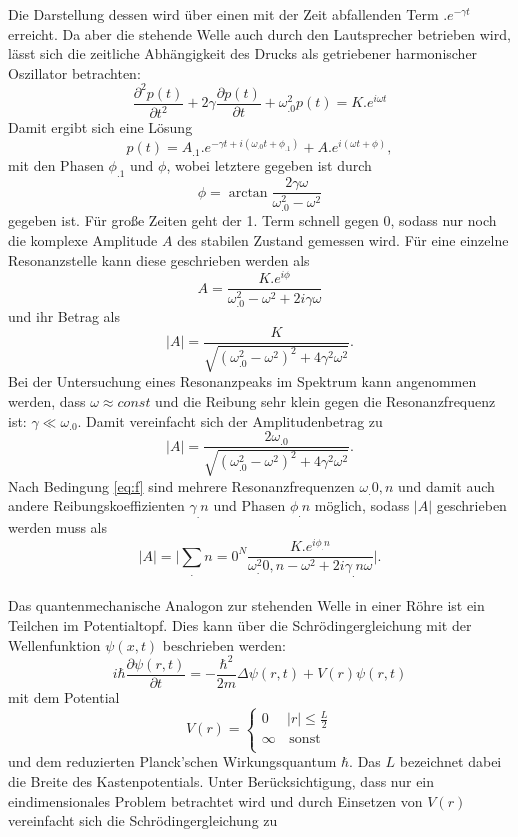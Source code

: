 Die Darstellung dessen wird über einen mit der Zeit abfallenden Term $.e^{-\gamma t}$ erreicht.
Da aber die stehende Welle auch durch den Lautsprecher betrieben wird, lässt sich die zeitliche Abhängigkeit des Drucks als getriebener harmonischer Oszillator betrachten:
\[
\frac{\partial^2p(t)}{\partial t^2}+2\gamma\frac{\partial p(t)}{\partial t}+\omega_.0^2p(t)=K .e^{i\omega t}
\]
Damit ergibt sich eine Lösung 
\[
p(t)=A_.1 .e^{-\gamma t+i(\omega_.0 t+\phi_.1)}+A .e^{i(\omega t + \phi)},
\]
mit den Phasen $\phi_.1$ und $\phi$, wobei letztere gegeben ist durch 
\[
\phi=\arctan{\frac{2\gamma\omega}{\omega^2_.0-\omega^2}}
\]
gegeben ist.
Für große Zeiten geht der 1. Term schnell gegen $0$, sodass nur noch die komplexe Amplitude $A$ des stabilen Zustand gemessen wird.
Für eine einzelne Resonanzstelle kann diese geschrieben werden als
\[
A=\frac{K .e^{i\phi}}{\omega^2_.0-\omega^2+2i\gamma\omega}
\]
und ihr Betrag als
\[
|A|=\frac{K}{\sqrt{\left(\omega^2_.0-\omega^2\right)^2+4\gamma^2\omega^2}}\text{.}
\]
Bei der Untersuchung eines Resonanzpeaks im Spektrum kann angenommen werden, dass $\omega\approx const$ und die Reibung sehr klein gegen die Resonanzfrequenz ist: $\gamma\ll\omega_.0$. Damit vereinfacht sich der Amplitudenbetrag zu
\[
|A|=\frac{2\omega_.0}{\sqrt{\left(\omega^2_.0-\omega^2\right)^2+4\gamma^2\omega^2}}\text{.}
\]
Nach Bedingung \eqref{eq:f} sind mehrere Resonanzfrequenzen $\omega_.{0,n}$ und damit auch andere Reibungskoeffizienten $\gamma_.n$ und Phasen $\phi_.n$ möglich, sodass $|A|$ geschrieben werden muss als
\begin{equation}
|A|=\biggl|\sum_.{n=0}^N\frac{K .e^{i\phi_.n}}{\omega^2_.{0,n}-\omega^2+2 i\gamma_.n\omega}\biggl|\text{.}\label{eq:absA}
\end{equation}
\\
\newline
Das quantenmechanische Analogon zur stehenden Welle in einer Röhre ist ein Teilchen im Potentialtopf.
Dies kann über die Schrödingergleichung mit der Wellenfunktion $\psi(x,t)$ beschrieben werden:
\[
i\hbar\frac{\partial\psi(r,t)}{\partial t}=-\frac{\hbar^2}{2m}\Delta\psi(r,t) + V(r)\psi(r,t)
\]
mit dem Potential 
\[V(r) = \left\{
\begin{array}{ll}
0 & |r| \leq \frac{L}{2} \\
\infty & \, \textrm{sonst} \\
\end{array}
\right.
\]
und dem reduzierten Planck'schen Wirkungsquantum $\hbar$.
Das $L$ bezeichnet dabei die Breite des Kastenpotentials.
Unter Berücksichtigung, dass nur ein eindimensionales Problem betrachtet wird und durch Einsetzen von $V(r)$ vereinfacht sich die Schrödingergleichung zu
